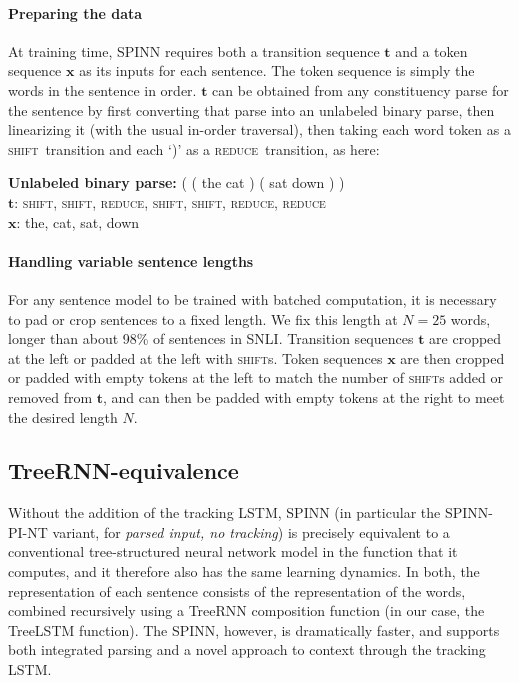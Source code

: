 \documentclass[11pt]{article}
\newcommand{\shift}{\textsc{shift}}
\newcommand{\reduce}{\textsc{reduce}}
\begin{document}
\paragraph{Preparing the data} At training time, SPINN requires both a transition sequence $\mathbf t$  and a token sequence $\mathbf x$ as its inputs for each sentence. The token sequence is simply the words in the sentence in order. $\mathbf t$ can be obtained from any constituency parse for the sentence by first converting that parse into an unlabeled binary parse, then linearizing it (with the usual in-order traversal), then taking each word token as a \shift~transition and each `)' as a \reduce~transition, as here:

\vspace{0.5em}
{\noindent\small
{\bf Unlabeled binary parse:} ( ( the cat ) ( sat down ) )\\
{$\mathbf t$}: \shift, \shift, \reduce, \shift, \shift, \reduce, \reduce\\
{$\mathbf x$}: the, cat, sat, down
}

\paragraph{Handling variable sentence lengths} For any sentence model to be trained with batched computation, it is necessary to pad or crop sentences to a fixed length. We fix this length at $N = 25$ words, longer than about 98\% of sentences in SNLI. Transition sequences $\mathbf t$ are cropped at the left or padded at the left with \shift s. Token sequences $\mathbf x$ are then cropped or padded with empty tokens at the left to match the number of \shift s added or removed from $\mathbf t$, and can then be padded with empty tokens at the right to meet the desired length $N$.


\subsection{TreeRNN-equivalence}

Without the addition of the tracking LSTM, SPINN (in particular the SPINN-PI-NT variant, for \textit{parsed input, no tracking}) is precisely equivalent to a conventional tree-structured neural network model in the function that it computes, and it therefore also has the same learning dynamics. In both, the representation of each sentence consists of the representation of the words, combined recursively using a TreeRNN composition function (in our case, the TreeLSTM function). The SPINN, however, is dramatically faster, and supports both integrated parsing and a novel approach to context through the tracking LSTM.
\end{document}
